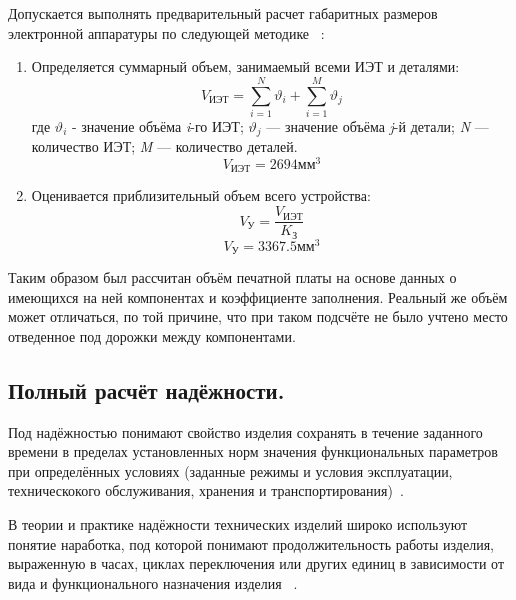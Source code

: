 Допускается выполнять предварительный расчет габаритных размеров
электронной аппаратуры по следующей методике ~\cite{Kostukevich2012}:
\begin{enumerate}
\item Определяется суммарный объем, занимаемый всеми ИЭТ и деталями:
  \begin{equation}
    V_{\textit{ИЭТ}} = \sum^N_{i=1}\vartheta_i +   \sum^M_{i=1}\vartheta_j
  \end{equation}
%
где $\vartheta_i$ - значение объёма \textit{i}-го ИЭТ;
$\vartheta_j$ — значение объёма \textit{j}-й детали;
\textit{N} — количество ИЭТ;
\textit{M} — количество деталей.
%
$$V_{\textit{ИЭТ}} =  2694 \text{мм}^3$$
\item Оценивается приблизительный объем всего устройства:
  \begin{equation}
    V_{\text{У}} = \frac{V_{\text{ИЭТ}}}{K_{\text{З}}}
  \end{equation}
%
  $$V_{\text{У}} =3367.5 \text{мм}^3$$
%
\end{enumerate}
%
Таким образом был рассчитан объём печатной платы на основе данных о
имеющихся на ней компонентах и коэффициенте заполнения.
Реальный же объём может отличаться, по той причине, что при таком
подсчёте не было учтено место отведенное под дорожки между
компонентами.



\subsection{Полный расчёт надёжности. }

Под надёжностью понимают свойство изделия сохранять в течение
заданного времени в пределах установленных норм значения
функциональных параметров при определённых условиях (заданные режимы и
условия эксплуатации, техническокого обслуживания, хранения и
транспортирования)~\cite{Borovikov2010}.

В теории и практике надёжности технических изделий широко используют
понятие наработка, под которой понимают продолжительность работы
изделия, выраженную в часах, циклах переключения или других единиц в
зависимости от вида и функционального назначения изделия ~\cite{Borovikov2010}.

